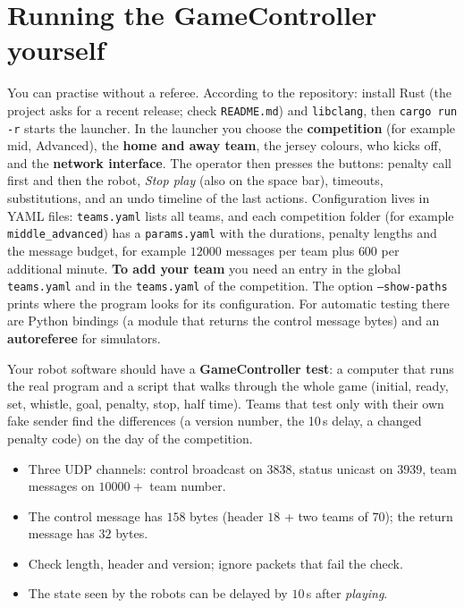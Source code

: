 \section*{Running the GameController yourself}
You can practise without a referee. According to the repository: install Rust (the project asks for a recent release; check \texttt{README.md}) and \texttt{libclang}, then \verb!cargo run -r! starts the launcher. In the launcher you choose the \textbf{competition} (for example mid, Advanced), the \textbf{home and away team}, the jersey colours, who kicks off, and the \textbf{network interface}. The operator then presses the buttons: penalty call first and then the robot, \emph{Stop play} (also on the space bar), timeouts, substitutions, and an undo timeline of the last actions. Configuration lives in YAML files: \texttt{teams.yaml} lists all teams, and each competition folder (for example \texttt{middle\_advanced}) has a \texttt{params.yaml} with the durations, penalty lengths and the message budget, for example $12000$ messages per team plus $600$ per additional minute. \textbf{To add your team} you need an entry in the global \texttt{teams.yaml} and in the \texttt{teams.yaml} of the competition. The option \texttt{--show-paths} prints where the program looks for its configuration. For automatic testing there are Python bindings (a module that returns the control message bytes) and an \textbf{autoreferee} for simulators.

\begin{aibox}
Your robot software should have a \textbf{GameController test}: a computer that runs the real program and a script that walks through the whole game (initial, ready, set, whistle, goal, penalty, stop, half time). Teams that test only with their own fake sender find the differences (a version number, the 10\,s delay, a changed penalty code) on the day of the competition.
\end{aibox}

\begin{keyidea}[Summary]
\begin{itemize}[nosep]
 \item Three UDP channels: control broadcast on $3838$, status unicast on $3939$, team messages on $10000+$ team number.
 \item The control message has $158$ bytes (header $18$ + two teams of $70$); the return message has $32$ bytes.
 \item Check length, header and version; ignore packets that fail the check.
 \item The state seen by the robots can be delayed by $10$\,s after \emph{playing}.
\end{itemize}
\end{keyidea}

